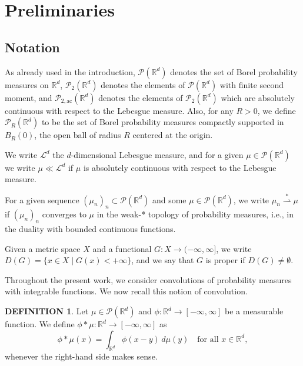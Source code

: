 \documentclass[11pt,leqno]{amsart}
\theoremstyle{definition}
\newtheorem{defi}[thm]{DEFINITION}
\newcommand{\be}{\begin{equation}}
\newcommand{\ee}{\end{equation}}
\newcommand{\bes}{\begin{equation*}}
\newcommand{\ees}{\end{equation*}}
\newcommand{\R}{{\mathord{\mathbb R}}}
\newcommand{\Rd}{{\mathord{\mathbb R}^d}}
\newcommand{\N}{{\mathord{\mathbb N}}}
\newcommand{\wsto}{\stackrel{*}{\rightharpoonup}}
\def\P{{\mathcal P}}
\def\Pac{\mathcal{P}_{\mathrm{2,ac}}}
\newcommand{\ird}{\int_{\mathord{\mathbb R}^d}}
\begin{document}
\section{Preliminaries}
\subsection{Notation}
As already used in the introduction, $\P(\Rd)$ denotes the set of Borel probability measures on $\Rd$, $\P_2(\Rd)$ denotes the elements of $\P(\Rd)$ with finite second moment, and $\Pac(\Rd)$ denotes the elements of $\P_2(\Rd)$ which are absolutely continuous with respect to the Lebesgue measure. Also, for any $R>0$, we define $\P_R(\R^d)$ to be the set of Borel probability measures compactly supported in $B_R(0)$, the open ball of radius $R$ centered at the origin.

We write $\mathcal{L}^d$ the $d$-dimensional Lebesgue measure, and for a given $\mu\in\P(\Rd)$ we write $\mu \ll \mathcal{L}^d$ if $\mu$ is absolutely continuous with respect to the Lebesgue measure.

For a given sequence $(\mu_n)_n \subset \P(\Rd)$ and some $\mu\in\P(\Rd)$, we write $\mu_n \wsto \mu$ if $(\mu_n)_n$ converges to $\mu$ in the weak-* topology of probability measures, i.e., in the duality with bounded continuous functions. 

Given a metric space $X$ and a functional $G\colon X \to (-\infty,\infty]$, we write $D(G) = \{ x\in X \mid G(x) < +\infty\}$, and we say that $G$ is proper if $D(G) \neq \emptyset$.


Throughout the present work, we consider convolutions of probability measures with integrable functions. We now recall this notion of convolution.
\begin{defi} \label{def:conv}
Let $\mu \in\P(\Rd)$ and $\phi\colon \R^d \to [-\infty,\infty]$ be a measurable function. We define $\phi*\mu\colon \R^d \to[-\infty,\infty]$ as
\be\label{eq:conv-meas}
	\phi*\mu(x) = \int_{\Rd} \phi(x-y) \,d\mu(y) \quad \mbox{for all $x\in\Rd$},
\ee
whenever the right-hand side makes sense.
\end{defi}
\end{document}
